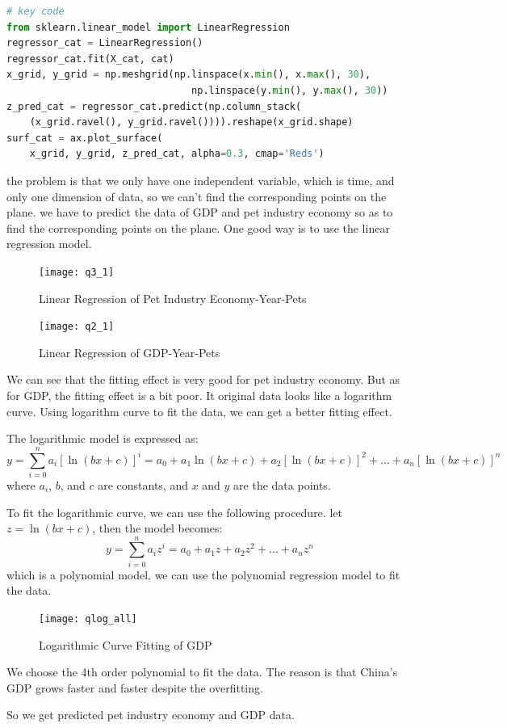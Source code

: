 \documentclass[withoutpreface,bwprint]{cumcmthesis} %
\begin{document}
\begin{lstlisting}[language=python]
# key code
from sklearn.linear_model import LinearRegression
regressor_cat = LinearRegression()
regressor_cat.fit(X_cat, cat)
x_grid, y_grid = np.meshgrid(np.linspace(x.min(), x.max(), 30),
                                np.linspace(y.min(), y.max(), 30))
z_pred_cat = regressor_cat.predict(np.column_stack(
    (x_grid.ravel(), y_grid.ravel()))).reshape(x_grid.shape)
surf_cat = ax.plot_surface(
    x_grid, y_grid, z_pred_cat, alpha=0.3, cmap='Reds')
\end{lstlisting}
\par the problem is that we only have one independent variable, which is time,
and only one dimension of data, so we can't find the corresponding points on the plane.
we have to predict the data of GDP and pet industry economy 
so as to find the corresponding points on the plane.
One good way is to use the linear regression model.
\clearpage
\begin{figure}[htbp]
	\centering
	\texttt{[image: q3\_1]}
	\caption{Linear Regression of Pet Industry Economy-Year-Pets}
\end{figure}
\begin{figure}[htbp]
	\centering
	\texttt{[image: q2\_1]}
	\caption{Linear Regression of GDP-Year-Pets}
\end{figure}
\par We can see that the fitting effect is very good for pet industry economy.
But as for GDP, the fitting effect is a bit poor. It original data looks like a logarithm curve.
Using logarithm curve to fit the data, we can get a better fitting effect.
\begin{definition}
The logarithmic model is expressed as:
\[
y = \sum_{i=0}^{n} a_i [\ln(bx + c)]^i = a_0 + a_1 \ln(bx + c) + a_2 [\ln(bx + c)]^2 + \dots + a_n [\ln(bx + c)]^n
\]
where \(a_i\), \(b\), and \(c\) are constants, and \(x\) and \(y\) are the data points.
\end{definition}
\begin{solution}
To fit the logarithmic curve, we can use the following procedure.
let \(z = \ln(bx + c)\), then the model becomes:
\[
y = \sum_{i=0}^{n} a_i z^i = a_0 + a_1 z + a_2 z^2 + \dots + a_n z^n
\]
which is a polynomial model, we can use the polynomial regression model to fit the data.
\end{solution}
\begin{figure}[htbp]
	\centering
	\texttt{[image: qlog\_all]}
	\caption{Logarithmic Curve Fitting of GDP}
\end{figure}
\par We choose the 4th order polynomial to fit the data.
The reason is that China's GDP grows faster and faster despite the overfitting.
\par So we get predicted pet industry economy and GDP data.
\end{document}
